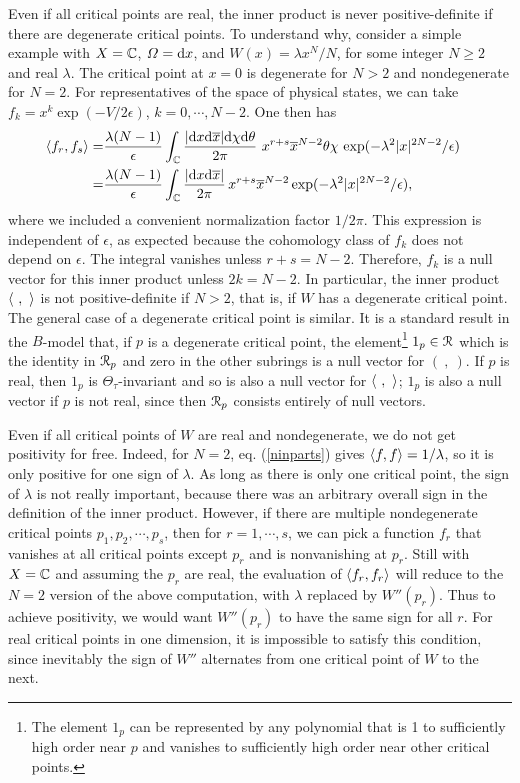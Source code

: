 \documentclass[11pt,a4paper]{article}
\begin{document}
Even if all critical points are real, the inner product is never positive-definite if there are degenerate critical points.
To understand why,  consider a simple example with $X={\mathbb C}$, $\varOmega=\mathrm d x$,  and $W(x)=\lambda x^N/N$, for some 
integer $N\geq 2$ and real $\lambda$. The critical point at $x=0$ is degenerate for $N>2$ and nondegenerate for $N=2$.
 For representatives of the space of physical states, we can take $f_k=x^k \exp(-V/2\epsilon)$, $k=0,\cdots, N-2$.  One then has
\begin{align}\label{ninparts}\langle f_r,f_s\rangle=&\frac{\lambda(N-1)}{\epsilon}\int _{\mathbb C}\frac{|\mathrm d x\mathrm d\overline x|\mathrm d\chi\mathrm d\theta}{2\pi}\, \,x^{r+s}\overline x^{N-2}\theta\chi\, \exp(-\lambda^2|x|^{2N-2}/\epsilon) \cr
=&\frac{\lambda(N-1)}{\epsilon}\int _{\mathbb C}\frac{|\mathrm d x\mathrm d\overline x|}{2\pi} \,x^{r+s}\overline x^{N-2}\exp(-\lambda^2|x|^{2N-2}/\epsilon),\end{align}
where we included a convenient normalization factor $1/2\pi$.
This expression is independent of $\epsilon$, as expected because the cohomology class of $f_k$ does not depend on $\epsilon$.
The integral vanishes unless $r+s=N-2$.   Therefore, $f_k$ is a null vector for this inner product unless $2k=N-2$.   In particular, the inner product
$\langle~,~\rangle$ is not positive-definite if $N>2$, that is, if $W$ has a degenerate critical point.  The general case of a degenerate critical point is similar.   
It is a standard result in the $B$-model that, if $p$ is a degenerate critical point, the element\footnote{The element $1_p$ can be represented
by any polynomial that is 1 to sufficiently high order near $p$ and vanishes to sufficiently high order near other critical points.}   $1_p\in {\mathcal R}$ which is the identity in ${\mathcal R}_p$ and zero in the other
subrings is a null vector for $(~,~)$.    If $p$ is real, then $1_p$ is $\Theta_\tau$-invariant and so is also a null vector for $\langle~,~\rangle$; $1_p$ is also a null vector if
$p$ is not real, since then ${\mathcal R}_p$ consists entirely of null vectors.


Even if all critical points of $W$ are real and nondegenerate, we do not get positivity for free.   Indeed, for $N=2$,  eq. (\ref{ninparts}) gives $\langle f,f\rangle=1/\lambda$, so it is only positive for one sign of $\lambda$.    As long as there is only one critical point, the sign of $\lambda$ is not really important,
because there was an arbitrary overall sign in the definition of the inner product.    However, if there are multiple nondegenerate critical points $p_1,p_2,\cdots , p_s$,
then for $r=1,\cdots, s$, we can pick a function $f_{r}$ that vanishes at all critical points except $p_r$ and is nonvanishing at $p_r$. 
Still with $X={\mathbb C}$ and assuming the $p_r$ are real, 
the evaluation of $\langle f_r,f_r\rangle$ will reduce to the $N=2$ version of the above computation, with $\lambda$ replaced by $W''(p_r)$.
Thus to achieve positivity, we would want $W''(p_r)$ to have the same sign for all $r$.  For real critical points in one dimension, 
 it is impossible  to satisfy
this condition, since inevitably 
the sign of $W''$ alternates from one critical point of $W$ to the next.
\end{document}
